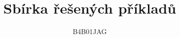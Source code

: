 \documentclass[11pt]{article}
\begin{document}
 
\title{\textbf{Sbírka řešených příkladů}}
\author{B4B01JAG}
\maketitle






 
\end{document}
